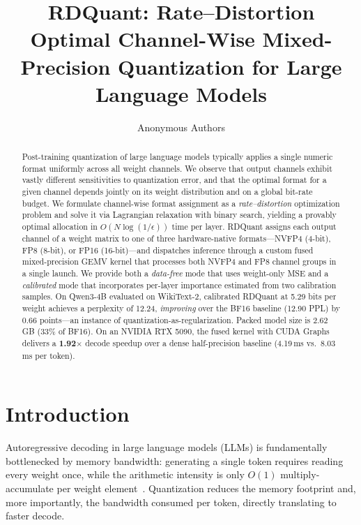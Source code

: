 \documentclass{article}
\title{RDQuant: Rate--Distortion Optimal Channel-Wise Mixed-Precision Quantization for Large Language Models}
\author{Anonymous Authors}
\date{}
\begin{document}
\maketitle

\begin{abstract}
Post-training quantization of large language models typically applies a single numeric format uniformly across all weight channels.
We observe that output channels exhibit vastly different sensitivities to quantization error, and that the optimal format for a given channel depends jointly on its weight distribution and on a global bit-rate budget.
We formulate channel-wise format assignment as a \emph{rate--distortion} optimization problem and solve it via Lagrangian relaxation with binary search, yielding a provably optimal allocation in $O(N \log(1/\epsilon))$ time per layer.
RDQuant assigns each output channel of a weight matrix to one of three hardware-native formats---NVFP4 (4-bit), FP8 (8-bit), or FP16 (16-bit)---and dispatches inference through a custom fused mixed-precision GEMV kernel that processes both NVFP4 and FP8 channel groups in a single launch.
We provide both a \emph{data-free} mode that uses weight-only MSE and a \emph{calibrated} mode that incorporates per-layer importance estimated from two calibration samples.
On Qwen3-4B evaluated on WikiText-2, calibrated RDQuant at 5.29 bits per weight achieves a perplexity of 12.24, \emph{improving} over the BF16 baseline (12.90 PPL) by 0.66 points---an instance of quantization-as-regularization.
Packed model size is 2.62\,GB (33\% of BF16).
On an NVIDIA RTX 5090, the fused kernel with CUDA Graphs delivers a \textbf{1.92$\times$} decode speedup over a dense half-precision baseline (4.19\,ms vs.\ 8.03\,ms per token).
\end{abstract}

\section{Introduction}
\label{sec:intro}

Autoregressive decoding in large language models (LLMs) is fundamentally bottlenecked by memory bandwidth: generating a single token requires reading every weight once, while the arithmetic intensity is only $O(1)$ multiply-accumulate per weight element~\cite{kwon2023vllm}.
Quantization reduces the memory footprint and, more importantly, the bandwidth consumed per token, directly translating to faster decode.
\end{document}
